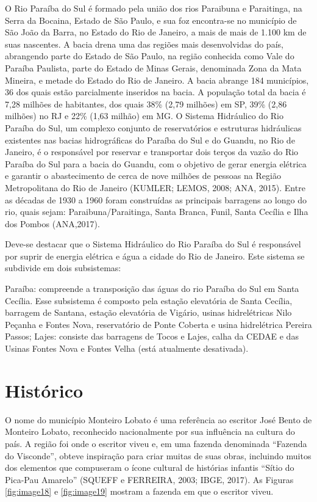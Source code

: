 O Rio Paraíba do Sul é formado pela união dos rios Paraibuna e Paraitinga, na Serra da Bocaina, Estado de São Paulo, e sua foz encontra-se no município de São João da Barra, no Estado do Rio de Janeiro, a mais de mais de 1.100 km de suas nascentes. A bacia drena uma das regiões mais desenvolvidas do país, abrangendo parte do Estado de São Paulo, na região conhecida como Vale do Paraíba Paulista, parte do Estado de Minas Gerais, denominada Zona da Mata Mineira, e metade do Estado do Rio de Janeiro. A bacia abrange 184 municípios, 36 dos quais estão parcialmente inseridos na bacia. A população  total da bacia é 7,28 milhões de habitantes, dos quais 38\% (2,79 milhões) em SP, 39\% (2,86 milhões) no RJ e 22\% (1,63 milhão) em MG. O Sistema Hidráulico do Rio Paraíba do Sul, um complexo conjunto de reservatórios e estruturas hidráulicas existentes nas bacias hidrográficas do Paraíba do Sul e do Guandu, no Rio de Janeiro, é o responsável por reservar e transportar dois terços da vazão do Rio Paraíba do Sul para a bacia do Guandu, com o objetivo de gerar energia elétrica e garantir o abastecimento de cerca de nove milhões de pessoas na Região Metropolitana do Rio de Janeiro (KUMLER; LEMOS, 2008; ANA, 2015). Entre as décadas de 1930 a 1960 foram construídas as principais barragens ao longo do rio, quais sejam: Paraibuna/Paraitinga, Santa Branca, Funil, Santa Cecília e Ilha dos Pombos (ANA,2017).

Deve-se destacar que o Sistema Hidráulico do Rio Paraíba do Sul é responsável por suprir de energia elétrica e água a cidade do Rio de Janeiro. Este sistema se subdivide em dois subsistemas:

Paraíba: compreende a transposição das águas do rio Paraíba do Sul em Santa Cecília. Esse subsistema é composto pela estação elevatória de Santa Cecília, barragem de Santana, estação elevatória de Vigário, usinas hidrelétricas Nilo Peçanha e Fontes Nova, reservatório de Ponte Coberta e usina hidrelétrica Pereira Passos;
Lajes: consiste das barragens de Tocos e Lajes, calha da CEDAE e das Usinas Fontes Nova e Fontes Velha (está atualmente desativada).

\section{Histórico}

O nome do município Monteiro Lobato é uma referência ao escritor José Bento de Monteiro Lobato, reconhecido nacionalmente por sua influência na cultura do país. A região foi onde o escritor viveu e, em uma fazenda denominada “Fazenda do Visconde”, obteve inspiração para criar muitas de suas obras, incluindo muitos dos elementos que compuseram o ícone cultural de histórias infantis “Sítio do Pica-Pau Amarelo” (SQUEFF e FERREIRA, 2003; IBGE, 2017). As Figuras \ref{fig:image18} e \ref{fig:image19} mostram a fazenda em que o escritor viveu.
 
